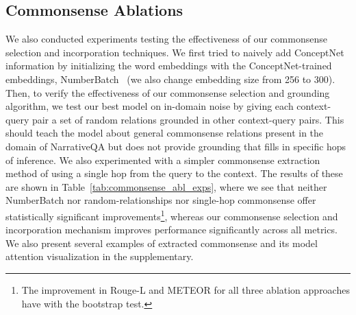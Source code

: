 \documentclass[11pt,a4paper]{article}
\def\tabref#1{Table~\ref{#1}}
\begin{document}
\subsection{Commonsense Ablations}

We also conducted experiments testing the effectiveness of our commonsense
selection and incorporation techniques.  We first tried to naively add
ConceptNet information by initializing the word embeddings with the
ConceptNet-trained embeddings, NumberBatch~\cite{speer2012representing} (we also
change embedding size from 256 to 300).  Then, to verify the effectiveness of
our commonsense selection and grounding algorithm, we test our best model on
in-domain noise by giving each context-query pair a set of random relations
grounded in other context-query pairs. This should teach the model about
general commonsense relations present in the domain of NarrativeQA but does not
provide grounding that fills in specific hops of inference. We also
experimented with a simpler commonsense extraction method of using a single hop
from the query to the context. The results of
these are shown in \tabref{tab:commonsense_abl_exps},
where we see that neither NumberBatch nor random-relationships nor single-hop commonsense offer
statistically significant improvements\footnote{The improvement in Rouge-L and METEOR for all three ablation approaches have
 with the bootstrap test.},
whereas our commonsense selection and incorporation mechanism improves performance significantly
across all metrics.
We also present several examples of extracted commonsense and its model attention visualization in the supplementary.
\end{document}
